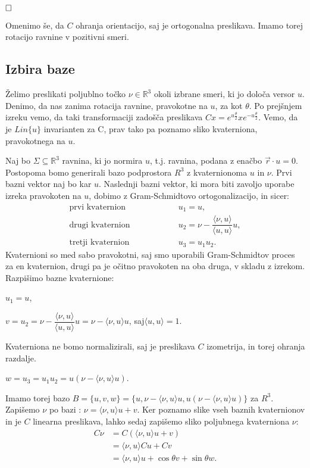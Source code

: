 \documentclass[a4paper,12pt]{article}
\def\R{\mathbb{R}} %
\newcommand{\dotpr}[2]{\langle #1, #2 \rangle}
\def\qed{$\hfill\Box$}   %
\begin{document}
\qed

Omenimo še, da $C$ ohranja orientacijo, saj je ortogonalna preslikava. Imamo torej rotacijo ravnine v pozitivni smeri.

\subsection{Izbira baze}

Želimo preslikati poljublno točko $\nu \in \R^3$ okoli izbrane smeri, ki jo določa versor $u$. Denimo, da nas zanima rotacija ravnine,
pravokotne na $u$, za kot $\theta$.
Po prejšnjem izreku vemo, da taki transformaciji zadošča preslikava $Cx = e^{u\frac{\theta}{2}}xe^{-u\frac{\theta}{2}}$. Vemo, da je $Lin\{u\}$ invarianten za C, prav tako pa poznamo sliko kvaterniona,
pravokotnega na $u$.

Naj bo $\Sigma \subseteq \R^3$ ravnina, ki jo normira $u$, t.j. ravnina, podana z enačbo $\vec{r}\cdot u = 0$. Postopoma bomo generirali bazo podprostora $R^3$ z kvaternionoma $u$ in $\nu$.
Prvi bazni vektor naj bo kar $u$. Naslednji bazni vektor, ki mora biti zavoljo uporabe izreka pravokoten na $u$, dobimo z Gram-Schmidtovo ortogonalizacijo, in sicer:
\begin{align*}
   \text{prvi kvaternion} &\hspace{5em}  u_{1} = u,\\
   \text{drugi kvaternion} &\hspace{5em}   u_{2} = \nu - \dfrac{\dotpr{\nu}{u}}{\dotpr{u}{u}} u,\\
   \text{tretji kvaternion} &\hspace{5em} u_{3} = u_{1} u_{2}.
\end{align*}
Kvaternioni so med sabo pravokotni, saj smo uporabili Gram-Schmidtov proces za en kvaternion, drugi pa je očitno pravokoten na oba druga, v skladu z izrekom. Razpišimo bazne kvaternione:

\begin{center}
   $u_{1} = u$,

   $v = u_{2} = \nu - \dfrac{\dotpr{\nu}{u}}{\dotpr{u}{u}}u = \nu - \dotpr{\nu}{u}u$, saj$\dotpr{u}{u} = 1$.
\end{center}
Kvaterniona ne bomo normalizirali, saj je preslikava $C$ izometrija, in torej ohranja razdalje.

\begin{center}
   $w = u_{3} = u_{1} u_{2} = u (\nu - \dotpr{\nu}{u}u)$.
\end{center}
Imamo torej bazo $B = \{u, v, w\} = \{u, \nu - \dotpr{\nu}{u}u, u(\nu - \dotpr{\nu}{u}u)\}$ za $R^3$.
Zapišemo $\nu$ po bazi : $\nu = \dotpr{\nu}{u}u + v$. Ker poznamo slike vseh baznih kvaternionov in je $C$ linearna preslikava,
lahko sedaj zapišemo sliko poljubnega kvaterniona $\nu$:
\begin{align*}
   C \nu &= C (\dotpr{\nu}{u}u + v)\\
         &= \dotpr{\nu}{u}Cu + Cv\\
         &= \dotpr{\nu}{u}u + \cos\theta v + \sin\theta w.
\end{align*}
\end{document}
